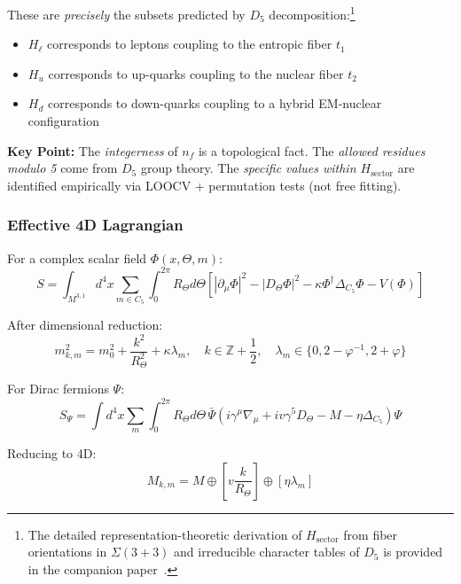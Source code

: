 \documentclass[12pt]{article}
\theoremstyle{definition}
\theoremstyle{plain}
\begin{document}
These are \emph{precisely} the subsets predicted by $D_5$ decomposition:\footnote{The detailed representation-theoretic derivation of $H_{\text{sector}}$ from fiber orientations in $\Sigma(3+3)$ and irreducible character tables of $D_5$ is provided in the companion paper~\cite{camargo2025sigmamoebius}.}
\begin{itemize}
\item $H_\ell$ corresponds to leptons coupling to the entropic fiber $t_1$
\item $H_u$ corresponds to up-quarks coupling to the nuclear fiber $t_2$
\item $H_d$ corresponds to down-quarks coupling to a hybrid EM-nuclear configuration
\end{itemize}

\textbf{Key Point:} The \emph{integerness} of $n_f$ is a topological fact. The \emph{allowed residues modulo 5} come from $D_5$ group theory. The \emph{specific values within $H_{\text{sector}}$} are identified empirically via LOOCV + permutation tests (not free fitting).

\subsubsection{Effective 4D Lagrangian}

For a complex scalar field $\Phi(x, \Theta, m)$:
\begin{equation}
S = \int_{M^{3,1}} d^4x \sum_{m \in C_5} \int_0^{2\pi} R_\Theta d\Theta \left[ |\partial_\mu \Phi|^2 - |D_\Theta \Phi|^2 - \kappa \Phi^\dagger \Delta_{C_5} \Phi - V(\Phi) \right]
\end{equation}

After dimensional reduction:
\begin{equation}
\boxed{m_{k,m}^2 = m_0^2 + \frac{k^2}{R_\Theta^2} + \kappa \lambda_m}, \quad k \in \mathbb{Z} + \frac{1}{2}, \quad \lambda_m \in \{0, 2-\varphi^{-1}, 2+\varphi\}
\end{equation}

For Dirac fermions $\Psi$:
\begin{equation}
S_\Psi = \int d^4x \sum_m \int_0^{2\pi} R_\Theta d\Theta \, \bar{\Psi} \left( i\gamma^\mu \nabla_\mu + iv\gamma^5 D_\Theta - M - \eta \Delta_{C_5} \right) \Psi
\end{equation}

Reducing to 4D:
\begin{equation}
M_{k,m} = M \oplus \left[ v \frac{k}{R_\Theta} \right] \oplus \left[ \eta \lambda_m \right]
\end{equation}
\end{document}
